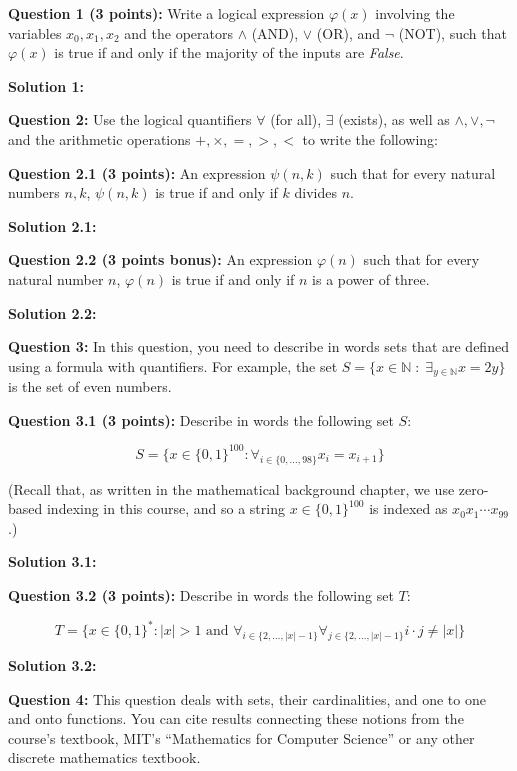 \documentclass[11pt]{article}
\begin{document}
\textbf{Question 1 (3 points):} Write a logical expression
\(\varphi(x)\) involving the variables \(x_0,x_1,x_2\) and the operators
\(\wedge\) (AND), \(\vee\) (OR), and \(\neg\) (NOT), such that
\(\varphi(x)\) is true if and only if the majority of the inputs are
\emph{False}.

\textbf{Solution 1:}

\textbf{Question 2:} Use the logical quantifiers \(\forall\) (for all),
\(\exists\) (exists), as well as \(\wedge,\vee,\neg\) and the arithmetic
operations \(+,\times,=,>,<\) to write the following:

\textbf{Question 2.1 (3 points):} An expression \(\psi(n,k)\) such that
for every natural numbers \(n,k\), \(\psi(n,k)\) is true if and only if
\(k\) divides \(n\).

\textbf{Solution 2.1:}

\textbf{Question 2.2 (3 points bonus):} An expression \(\varphi(n)\)
such that for every natural number \(n\), \(\varphi(n)\) is true if and
only if \(n\) is a power of three.

\textbf{Solution 2.2:}

\textbf{Question 3:} In this question, you need to describe in words
sets that are defined using a formula with quantifiers. For example, the
set \(S = \{ x\in \mathbb{N} \;:\; \exists_{y\in\mathbb{N}} x=2y \}\) is
the set of even numbers.

\textbf{Question 3.1 (3 points):} Describe in words the following set
\(S\):

\[
S = \{ x\in \{0,1\}^{100} : \forall_{i\in \{0,\ldots, 98\}} x_i = x_{i+1} \}
\]

(Recall that, as written in the mathematical background chapter, we use
zero-based indexing in this course, and so a string
\(x\in \{0,1\}^{100}\) is indexed as \(x_0x_1\cdots x_{99}\).)

\textbf{Solution 3.1:}

\textbf{Question 3.2 (3 points):} Describe in words the following set
\(T\):

\[
T = \{ x\in \{0,1\}^* : |x|>1 \mbox{ and } \forall_{i \in \{2,\ldots,|x|-1 \} } \forall_{j \in \{2,\ldots,|x|-1\}} i\cdot j \neq |x| \}
\]

\textbf{Solution 3.2:}

\textbf{Question 4:} This question deals with sets, their cardinalities,
and one to one and onto functions. You can cite results connecting these
notions from the course's textbook, MIT's ``Mathematics for Computer
Science'' or any other discrete mathematics textbook.
\end{document}
